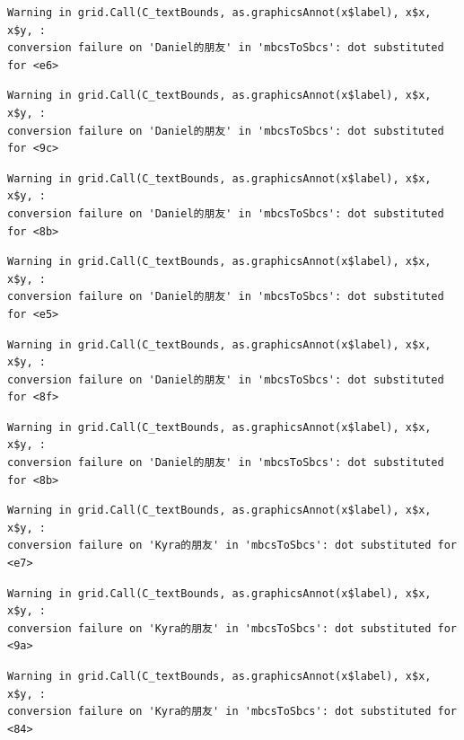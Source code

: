 \documentclass[
  letterpaper,
  DIV=11,
  numbers=noendperiod]{scrreprt}
\begin{document}
\begin{verbatim}
Warning in grid.Call(C_textBounds, as.graphicsAnnot(x$label), x$x, x$y, :
conversion failure on 'Daniel的朋友' in 'mbcsToSbcs': dot substituted for <e6>
\end{verbatim}

\begin{verbatim}
Warning in grid.Call(C_textBounds, as.graphicsAnnot(x$label), x$x, x$y, :
conversion failure on 'Daniel的朋友' in 'mbcsToSbcs': dot substituted for <9c>
\end{verbatim}

\begin{verbatim}
Warning in grid.Call(C_textBounds, as.graphicsAnnot(x$label), x$x, x$y, :
conversion failure on 'Daniel的朋友' in 'mbcsToSbcs': dot substituted for <8b>
\end{verbatim}

\begin{verbatim}
Warning in grid.Call(C_textBounds, as.graphicsAnnot(x$label), x$x, x$y, :
conversion failure on 'Daniel的朋友' in 'mbcsToSbcs': dot substituted for <e5>
\end{verbatim}

\begin{verbatim}
Warning in grid.Call(C_textBounds, as.graphicsAnnot(x$label), x$x, x$y, :
conversion failure on 'Daniel的朋友' in 'mbcsToSbcs': dot substituted for <8f>
\end{verbatim}

\begin{verbatim}
Warning in grid.Call(C_textBounds, as.graphicsAnnot(x$label), x$x, x$y, :
conversion failure on 'Daniel的朋友' in 'mbcsToSbcs': dot substituted for <8b>
\end{verbatim}

\begin{verbatim}
Warning in grid.Call(C_textBounds, as.graphicsAnnot(x$label), x$x, x$y, :
conversion failure on 'Kyra的朋友' in 'mbcsToSbcs': dot substituted for <e7>
\end{verbatim}

\begin{verbatim}
Warning in grid.Call(C_textBounds, as.graphicsAnnot(x$label), x$x, x$y, :
conversion failure on 'Kyra的朋友' in 'mbcsToSbcs': dot substituted for <9a>
\end{verbatim}

\begin{verbatim}
Warning in grid.Call(C_textBounds, as.graphicsAnnot(x$label), x$x, x$y, :
conversion failure on 'Kyra的朋友' in 'mbcsToSbcs': dot substituted for <84>
\end{verbatim}
\end{document}
